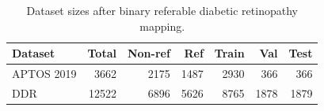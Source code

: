 \begin{table}[t]
\centering
\small
\caption{Dataset sizes after binary referable diabetic retinopathy mapping.}
\label{tab:dataset-summary}
\begin{tabular}{lrrrrrr}
\toprule
Dataset & Total & Non-ref & Ref & Train & Val & Test \\
\midrule
APTOS 2019 & 3662 & 2175 & 1487 & 2930 & 366 & 366 \\
DDR & 12522 & 6896 & 5626 & 8765 & 1878 & 1879 \\
\bottomrule
\end{tabular}
\end{table}
